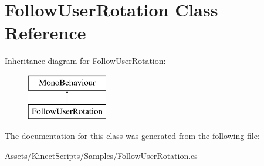 \hypertarget{class_follow_user_rotation}{}\section{Follow\+User\+Rotation Class Reference}
\label{class_follow_user_rotation}
Inheritance diagram for Follow\+User\+Rotation\+:\begin{figure}[H]
\begin{center}
\leavevmode
\includegraphics[height=2.000000cm]{class_follow_user_rotation}
\end{center}
\end{figure}


The documentation for this class was generated from the following file\+:\begin{DoxyCompactItemize}
\item 
Assets/\+Kinect\+Scripts/\+Samples/Follow\+User\+Rotation.\+cs\end{DoxyCompactItemize}
